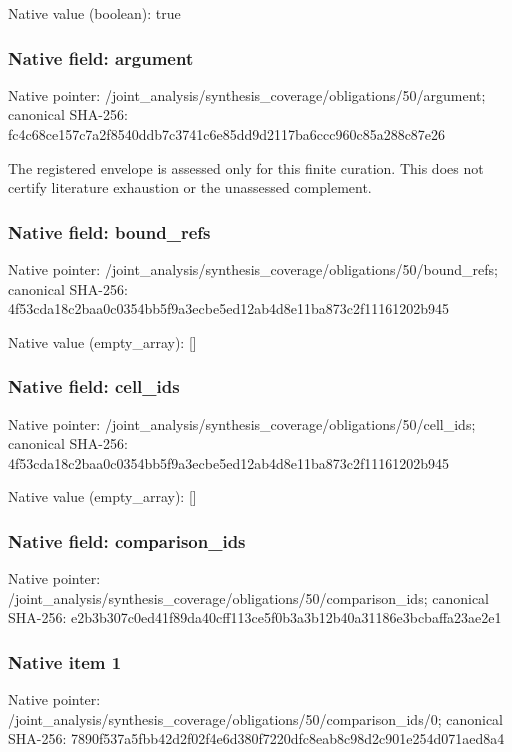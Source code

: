 \documentclass[10pt,a4paper]{article}
\begin{document}
Native value (boolean): true

\subsubsection{Native field: argument}
Native pointer: /joint\_\allowbreak{}analysis/synthesis\_\allowbreak{}coverage/obligations/50/argument; canonical SHA-256: fc4c68ce157c7a2f8540ddb7c3741c6e85dd9d2117ba6ccc960c85a288c87e26

\begingroup\raggedright\sloppy The registered envelope is assessed only for this finite curation. This does not certify literature exhaustion or the unassessed complement.\par\endgroup

\subsubsection{Native field: bound\_\allowbreak{}refs}
Native pointer: /joint\_\allowbreak{}analysis/synthesis\_\allowbreak{}coverage/obligations/50/bound\_\allowbreak{}refs; canonical SHA-256: 4f53cda18c2baa0c0354bb5f9a3ecbe5ed12ab4d8e11ba873c2f11161202b945

Native value (empty\_\allowbreak{}array): []

\subsubsection{Native field: cell\_\allowbreak{}ids}
Native pointer: /joint\_\allowbreak{}analysis/synthesis\_\allowbreak{}coverage/obligations/50/cell\_\allowbreak{}ids; canonical SHA-256: 4f53cda18c2baa0c0354bb5f9a3ecbe5ed12ab4d8e11ba873c2f11161202b945

Native value (empty\_\allowbreak{}array): []

\subsubsection{Native field: comparison\_\allowbreak{}ids}
Native pointer: /joint\_\allowbreak{}analysis/synthesis\_\allowbreak{}coverage/obligations/50/comparison\_\allowbreak{}ids; canonical SHA-256: e2b3b307c0ed41f89da40cff113ce5f0b3a3b12b40a31186e3bcbaffa23ae2e1

\subsubsection{Native item 1}
Native pointer: /joint\_\allowbreak{}analysis/synthesis\_\allowbreak{}coverage/obligations/50/comparison\_\allowbreak{}ids/0; canonical SHA-256: 7890f537a5fbb42d2f02f4e6d380f7220dfc8eab8c98d2c901e254d071aed8a4
\end{document}
